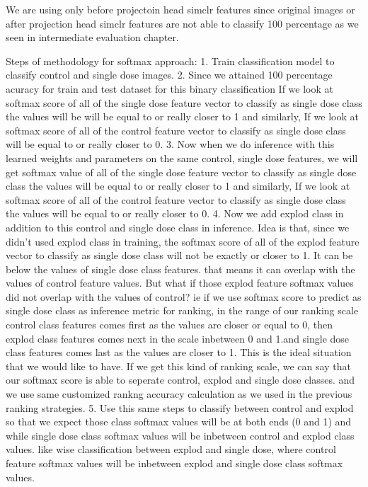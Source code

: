 We are using only before projectoin head simclr features since original images or after projection head simclr features are not able to classify 100 percentage as we seen in intermediate evaluation chapter.

Steps of methodology for softmax approach:
1. Train classification model to classify control and single dose images.
2. Since we attained 100 percentage acuracy for train and test dataset for this binary classification If we look at softmax score of all of the single dose feature vector to classify as single dose class the values will be will be equal to  or really closer to 1 and similarly, If we look at softmax score of all of the control feature vector to classify as single dose class will be equal to or really closer to 0.
3. Now when we do inference with this learned weights and parameters on the same control, single dose features, we will get   softmax value of all of the single dose feature vector to classify as single dose class the values will be equal to  or really closer to 1 and similarly, If we look at softmax score of all of the control feature vector to classify as single dose class the values will be equal to or really closer to 0.
4. Now we add explod class in addition to this control and single dose class in inference. Idea is that, since we didn't used explod class in training, the softmax score of all of the explod feature vector to classify as single dose class  will not be exactly or closer to 1. It can be below  the values of single dose class features. that  means it can overlap with the values of control feature values. But what if those explod feature softmax values did not overlap with the values of control? ie if we use softmax score to predict as single dose class as inference metric for ranking, in the range of our ranking scale control class features comes first as the values are closer or equal to 0, then explod class features comes next in the scale inbetween 0 and 1.and single dose class features comes last as the values are closer to 1. This is the ideal situation that we would like to have. If we get this kind of ranking scale, we can say that our softmax score is able to seperate control, explod and single dose classes. and we use same customized rankng accuracy calculation as we used in the previous ranking strategies.
5. Use this same steps to classify between control and explod so that we expect those class softmax values will be at both ends (0 and 1) and while single dose class softmax values will be inbetween control and explod class values. like wise classification between explod and single dose, where control feature softmax values will be inbetween explod and single dose class softmax values.

